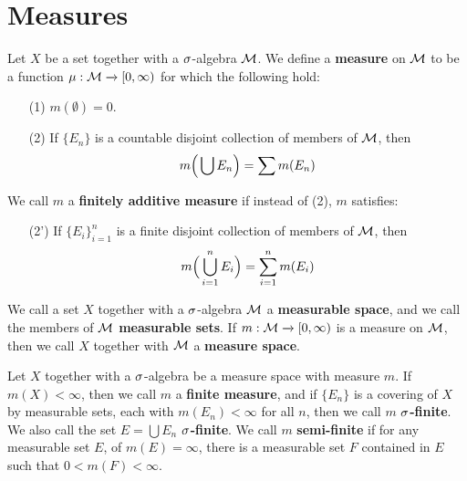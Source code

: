 \section{Measures}

\begin{definition}
    Let $X$ be a set together with a $\sigma$-algebra $\mathcal{M}$. We define a
    \textbf{measure} on $\mathcal{M}$ to be a function  $\mu:\mathcal{M} \xrightarrow{} [0,
    \infty)$ for which the following hold:
    \begin{enumerate}
        \item[(1)] $m(\emptyset)=0$.

        \item[(2)] If $\{E_n\}$ is a countable disjoint collection of members of
            $\mathcal{M}$, then
            \begin{equation}\label{equation_1.2}
                m\Big{(} \bigcup{E_n} \Big{)}=\sum{m(E_n)}
            \end{equation}
    \end{enumerate}
    We call $m$ a \textbf{finitely additive measure} if instead of (2), $m$
    satisfies:
    \begin{enumerate}
        \item[(2')] If $\{E_i\}_{i=1}^n$ is a finite disjoint collection of
            members of $\mathcal{M}$, then
            \begin{equation}\label{equation_1.2}
                m\Big{(} \bigcup_{i=1}^n{E_i} \Big{)}=\sum_{i=1}^n{m(E_i)}
            \end{equation}
    \end{enumerate}
\end{definition}

\begin{definition}
    We call a set $X$ together with a $\sigma$-algebra $\mathcal{M}$ a \textbf{measurable
    space}, and we call the members of $\mathcal{M}$ \textbf{measurable sets}. If $m:\mathcal{M}
    \xrightarrow{} [0, \infty)$ is a measure on $\mathcal{M}$, then we call  $X$
    together with $\mathcal{M}$ a \textbf{measure space}.
\end{definition}

\begin{definition}
    Let $X$ together with a $\sigma$-algebra be a measure space with measure $m$. If
     $m(X)<\infty$, then we call $m$ a \textbf{finite measure}, and if $\{E_n\}$
     is a covering of $X$ by measurable sets, each with  $m(E_n)<\infty$ for all
     $n$, then we call $m$  \textbf{$\sigma$-finite}. We also call the set
     $E=\bigcup{E_n}$ \textbf{$\sigma$-finite}. We call $m$ \textbf{semi-finite} if
     for any measurable set $E$, of $m(E)=\infty$, there is a measurable set $F$
     contained in  $E$ such that  $0<m(F)<\infty$.
\end{definition}

